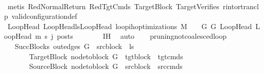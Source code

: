 \begin{isabellebody}
\ \ \ \ \ \ \ \ \isamarkupfalse%
\ {\isacharparenleft}{\kern0pt}metis\ RedNormalReturn\ RedTgtCmds\ TargetBlock\ TargetVerifies\ r{\isacharunderscore}{\kern0pt}into{\isacharunderscore}{\kern0pt}rtranclp\ valid{\isacharunderscore}{\kern0pt}configuration{\isacharunderscore}{\kern0pt}def{\isacharparenright}{\kern0pt}\isanewline
\ \ \ \ \isamarkupfalse%
\isanewline
\isanewline
\ \ \ \ \isamarkupfalse%
\ {\isachardoublequoteopen}{\isasymforall}{\isacharparenleft}{\kern0pt}LoopHead{\isacharcomma}{\kern0pt}\ LoopHead{\isacharprime}{\kern0pt}{\isacharparenright}{\kern0pt}{\isasymin}lsLoopHead{\isachardot}{\kern0pt}\ loop{\isacharunderscore}{\kern0pt}ih{\isacharunderscore}{\kern0pt}optimizations\ M\ {\isasymLambda}\ {\isasymGamma}\ {\isasymOmega}\ G\ G{\isacharprime}{\kern0pt}\ LoopHead\ LoopHead{\isacharprime}{\kern0pt}\ m{\isacharprime}{\kern0pt}\ s{\isacharprime}{\kern0pt}\ j\ posts{\isachardoublequoteclose}\isanewline
\ \ \ \ \ \ \isamarkupfalse%
\ IH\ \isamarkupfalse%
\ auto\isanewline
\ \ \isamarkupfalse%
\isanewline
{}\isamarkupfalse%
%
\endisatagproof
{\isafoldproof}%
%
\isadelimproof
%
\endisadelimproof
%
\isadelimdocument
%
\endisadelimdocument
%
\isatagdocument
%
\isamarkuptrue%
%
\endisatagdocument
{\isafolddocument}%
%
\isadelimdocument
%
\endisadelimdocument
{}\isamarkupfalse%
\ pruning{\isacharunderscore}{\kern0pt}not{\isacharunderscore}{\kern0pt}coalesced{\isacharunderscore}{\kern0pt}loop{\isacharcolon}{\kern0pt}\isanewline
\ \ \ SuccBlocks{\isacharcolon}{\kern0pt}\ {\isachardoublequoteopen}out{\isacharunderscore}{\kern0pt}edges\ G\ {\isacharbang}{\kern0pt}\ src{\isacharunderscore}{\kern0pt}block\ {\isacharequal}{\kern0pt}\ ls{\isachardoublequoteclose}\isanewline
\ \ \ \ \ \ \ TargetBlock{\isacharcolon}{\kern0pt}\ {\isachardoublequoteopen}node{\isacharunderscore}{\kern0pt}to{\isacharunderscore}{\kern0pt}block\ G{\isacharprime}{\kern0pt}\ {\isacharbang}{\kern0pt}\ tgt{\isacharunderscore}{\kern0pt}block\ {\isacharequal}{\kern0pt}\ tgt{\isacharunderscore}{\kern0pt}cmds{\isachardoublequoteclose}\isanewline
\ \ \ \ \ \ \ SourceBlock{\isacharcolon}{\kern0pt}\ {\isachardoublequoteopen}node{\isacharunderscore}{\kern0pt}to{\isacharunderscore}{\kern0pt}block\ G\ {\isacharbang}{\kern0pt}\ src{\isacharunderscore}{\kern0pt}block\ {\isacharequal}{\kern0pt}\ src{\isacharunderscore}{\kern0pt}cmds{\isachardoublequoteclose}\isanewline

\end{isabellebody}
